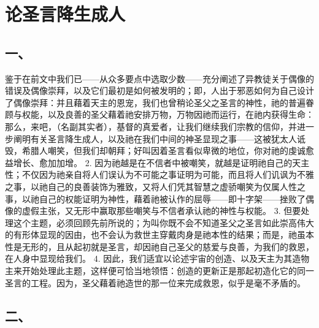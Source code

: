 
\chapter{论圣言降生成人}



\section{一、}

鉴于在前文中我们已——从众多要点中选取少数——充分阐述了异教徒关于偶像的错误及偶像崇拜，以及它们最初是如何被发明的；即，人出于邪恶如何为自己设计了偶像崇拜：并且藉着天主的恩宠，我们也曾稍论圣父之圣言的神性，祂的普遍眷顾与权能，以及良善的圣父藉着祂安排万物，万物因祂而运行，在祂内获得生命：那么，来吧，（名副其实者），基督的真爱者，让我们继续我们宗教的信仰，并进一步阐明有关圣言降生成人，以及祂在我们中间的神圣显现之事——这被犹太人诋毁，希腊人嘲笑，但我们却朝拜；好叫因着圣言看似卑微的地位，你对祂的虔诚愈益增长、愈加加增。 2. 因为祂越是在不信者中被嘲笑，就越是证明祂自己的天主性；不仅因为祂亲自将人们误认为不可能之事证明为可能，而且将人们讥讽为不雅之事，以祂自己的良善装饰为雅致，又将人们凭其智慧之虚骄嘲笑为仅属人性之事，以祂自己的权能证明为神性，藉着祂被认作的屈辱——即十字架——挫败了偶像的虚假主张，又无形中赢取那些嘲笑与不信者承认祂的神性与权能。 3. 但要处理这个主题，必须回顾先前所说的；为叫你既不会不知道圣父之圣言如此崇高伟大的有形体显现的因由，也不会认为救世主穿戴肉身是祂本性的结果；而是，祂虽本性是无形的，且从起初就是圣言，却因祂自己圣父的慈爱与良善，为我们的救恩，在人身中显现给我们。 4. 因此，我们适宜以论述宇宙的创造、以及天主为其造物主来开始处理此主题，这样便可恰当地领悟：创造的更新正是那起初造化它的同一圣言的工程。因为，圣父藉着祂造世的那一位来完成救恩，似乎是毫不矛盾的。\par


\section{二、}

